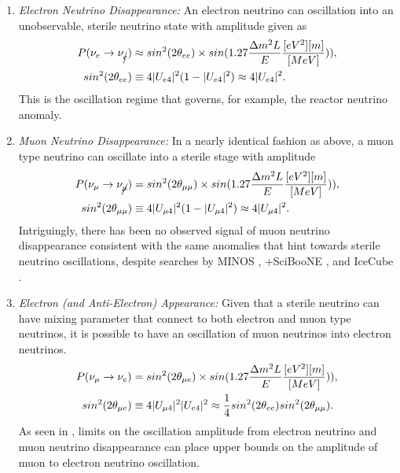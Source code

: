\begin{enumerate}
  \item{ \em Electron Neutrino Disappearance:} An electron neutrino can oscillation into an unobservable, sterile neutrino state with amplitude given as
  \begin{align}
  P(\nu_{e} \rightarrow \nu_{\cancel{e}}) &\approx sin^2(2 \theta_{ee})\times sin(1.27 \frac{\Delta m^2 L}{E} \frac{[eV^2][m]}{[MeV]})),
   \\
  sin^2(2 \theta_{ee}) &\equiv 4 |U_{e4}|^2 (1 - |U_{e4}|^2) \approx 4 |U_{e4}|^2.
  \end{align}
  This is the oscillation regime that governs, for example, the reactor neutrino anomaly.
  \item { \em Muon Neutrino Disappearance: } In a nearly identical fashion as above, a muon type neutrino can oscillate into a sterile stage with amplitude 
  \begin{align}
  P(\nu_{\mu} \rightarrow \nu_{\cancel{\mu}}) &= sin^2(2 \theta_{\mu\mu})\times sin(1.27 \frac{\Delta m^2 L}{E} \frac{[eV^2][m]}{[MeV]})),
   \\
  sin^2(2 \theta_{\mu\mu}) &\equiv 4 |U_{\mu4}|^2 (1 - |U_{\mu4}|^2) \approx 4 |U_{\mu 4}|^2.
  \end{align}
  Intriguingly, there has been no observed signal of muon neutrino disappearance consistent with the same anomalies that hint towards sterile neutrino oscillations, despite searches by MINOS \cite{Adamson:2010wi}, \MB+SciBooNE \cite{Mahn:2011ea}, and IceCube \cite{TheIceCube:2016oqi}.

  \item { \em Electron (and Anti-Electron) Appearance:} Given that a sterile neutrino can have mixing parameter that connect to both electron and muon type neutrinos, it is possible to have an oscillation of muon neutrinos into electron neutrinos.
  \begin{align}
  P(\nu_{\mu} \rightarrow \nu_{e}) &= sin^2(2 \theta_{\mu e})\times sin(1.27 \frac{\Delta m^2 L}{E} \frac{[eV^2][m]}{[MeV]})),
   \\
  sin^2(2 \theta_{\mu e}) &\equiv 4 |U_{\mu4}|^2|U_{e4}|^2 \approx \frac{1}{4} sin^2(2 \theta_{ee}) sin^2(2 \theta_{\mu \mu}).
  \end{align}
  As seen in \cite{Kopp:2013vaa,Giunti:2011gz}, limits on the oscillation amplitude from electron neutrino and muon neutrino disappearance can place upper bounds on the amplitude of muon to electron neutrino oscillation.
\end{enumerate}


